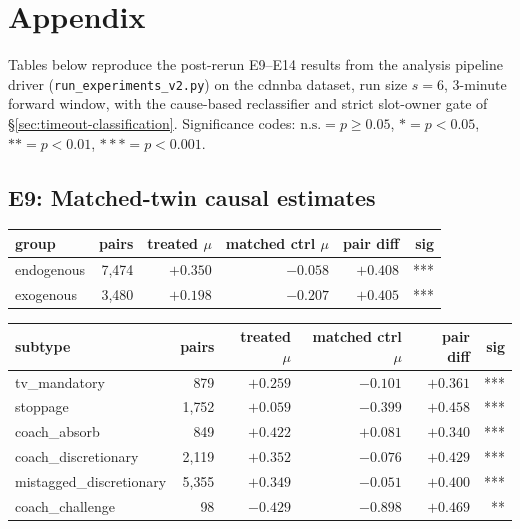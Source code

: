 \documentclass[twoside,11pt]{article}
\begin{document}
\newpage



\section*{Appendix}

Tables below reproduce the post-rerun E9--E14 results from the analysis pipeline driver
(\texttt{run\_experiments\_v2.py}) on the cdnnba dataset, run size $s = 6$, 3-minute forward window, with
the cause-based reclassifier and strict slot-owner gate of \S\ref{sec:timeout-classification}. Significance
codes: $\text{n.s.} = p \geq 0.05$, $* = p < 0.05$, $** = p < 0.01$, $*** = p < 0.001$.

\subsection*{E9: Matched-twin causal estimates}

\begin{tabular}{lrrrrr}
		\toprule
		group & pairs & treated $\mu$ & matched ctrl $\mu$ & pair diff & sig \\
		\midrule
		endogenous & 7{,}474 & $+0.350$ & $-0.058$ & $+0.408$ & *** \\
		exogenous  & 3{,}480 & $+0.198$ & $-0.207$ & $+0.405$ & *** \\
		\bottomrule
\end{tabular}

\vspace{0.3em}

\begin{tabular}{lrrrrr}
		\toprule
		subtype & pairs & treated $\mu$ & matched ctrl $\mu$ & pair diff & sig \\
		\midrule
		tv\_mandatory            & 879   & $+0.259$ & $-0.101$ & $+0.361$ & *** \\
		stoppage                 & 1{,}752 & $+0.059$ & $-0.399$ & $+0.458$ & *** \\
		coach\_absorb            & 849   & $+0.422$ & $+0.081$ & $+0.340$ & *** \\
		coach\_discretionary     & 2{,}119 & $+0.352$ & $-0.076$ & $+0.429$ & *** \\
		mistagged\_discretionary & 5{,}355 & $+0.349$ & $-0.051$ & $+0.400$ & *** \\
		coach\_challenge         & 98    & $-0.429$ & $-0.898$ & $+0.469$ & **  \\
		\bottomrule
\end{tabular}
\end{document}
